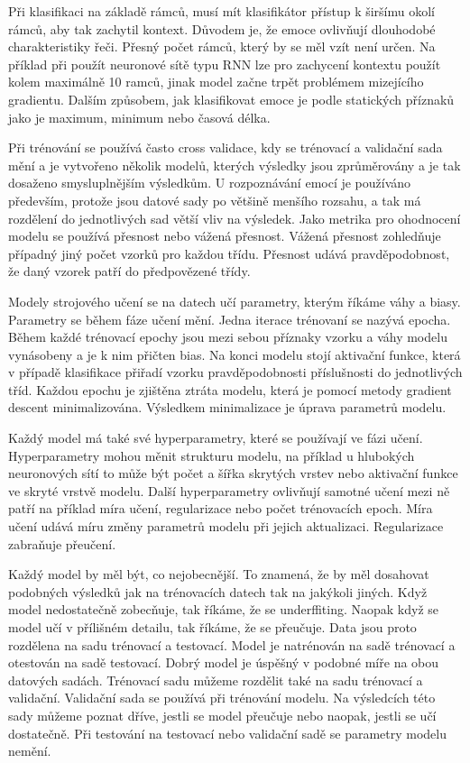 \documentclass[FM,BP]{tulthesis}
\begin{document}
Při klasifikaci na základě rámců, musí mít klasifikátor přístup k širšímu okolí rámců, aby tak zachytil kontext. Důvodem je, že emoce ovlivňují dlouhodobé charakteristiky řeči. Přesný počet rámců, který by se měl vzít není určen. Na příklad při použít neuronové sítě typu RNN lze pro zachycení kontextu použít kolem maximálně 10 ramců, jinak model začne trpět problémem mizejícího gradientu. Dalším způsobem, jak klasifikovat emoce je podle statických příznaků jako je maximum, minimum nebo časová délka\cite{konar_chakraborty_2015}.

Při trénování se používá často cross validace, kdy se trénovací a validační sada mění a je vytvořeno několik modelů, kterých výsledky jsou zprůměrovány a je tak dosaženo smysluplnějším výsledkům. U rozpoznávání emocí je používáno především, protože jsou datové sady po většině menšího rozsahu, a tak má rozdělení do jednotlivých sad větší vliv na výsledek. Jako metrika pro ohodnocení modelu se používá přesnost nebo vážená přesnost. Vážená přesnost zohledňuje případný jiný počet vzorků pro každou třídu. Přesnost udává pravděpodobnost, že daný vzorek patří do předpovězené třídy\cite{konar_chakraborty_2015}.

Modely strojového učení se na datech učí parametry, kterým říkáme váhy a biasy. Parametry se během fáze učení mění. Jedna iterace trénovaní se nazývá epocha. Během každé trénovací epochy jsou mezi sebou příznaky vzorku a váhy modelu vynásobeny a je k nim přičten bias. Na konci modelu stojí aktivační funkce, která v případě klasifikace přiřadí vzorku pravděpodobnosti příslušnosti do jednotlivých tříd. Každou epochu je zjištěna ztráta modelu, která je pomocí metody gradient descent minimalizována. Výsledkem minimalizace je úprava parametrů modelu.

Každý model má také své hyperparametry, které se používají ve fázi učení.\cite{leonel_2019} Hyperparametry mohou měnit strukturu modelu, na příklad u hlubokých neuronových sítí to může být počet a šířka skrytých vrstev nebo aktivační funkce ve skryté vrstvě modelu. Další hyperparametry ovlivňují samotné učení mezi ně patří na příklad míra učení, regularizace nebo počet trénovacích epoch. Míra učení udává míru změny parametrů modelu při jejich aktualizaci. Regularizace zabraňuje přeučení.

Každý model by měl být, co nejobecnější. To znamená, že by měl dosahovat podobných výsledků jak na trénovacích datech tak na jakýkoli jiných. Když model nedostatečně zobecňuje, tak říkáme, že se underffiting. Naopak když se model učí v přílišném detailu, tak říkáme, že se přeučuje. Data jsou proto rozdělena na sadu trénovací a testovací. Model je natrénován na sadě trénovací a otestován na sadě testovací. Dobrý model je úspěšný v podobné míře na obou datových sadách. Trénovací sadu můžeme rozdělit také na sadu trénovací a validační. Validační sada se používá při trénování modelu. Na výsledcích této sady můžeme poznat dříve, jestli se model přeučuje nebo naopak, jestli se učí dostatečně. Při testování na testovací nebo validační sadě se parametry modelu nemění. 
\end{document}
